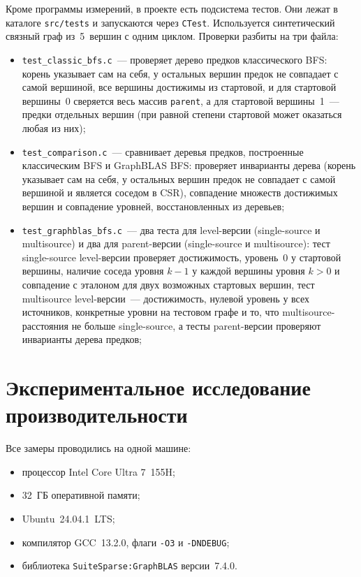 \documentclass[a4paper]{article}
\begin{document}
Кроме программы измерений, в проекте есть подсистема тестов. Они лежат в каталоге \texttt{src/tests} и запускаются через \texttt{CTest}. Используется синтетический связный граф из~5~вершин с одним циклом. Проверки разбиты на три файла:
\begin{itemize}
    \item \texttt{test\_classic\_bfs.c}~--- проверяет дерево предков классического BFS: корень указывает сам на себя, у остальных вершин предок не совпадает с самой вершиной, все вершины достижимы из стартовой, и для стартовой вершины~0 сверяется весь массив \texttt{parent}, а для стартовой вершины~1~--- предки отдельных вершин (при равной степени стартовой может оказаться любая из них);
    \item \texttt{test\_comparison.c}~--- сравнивает деревья предков, построенные классическим BFS и GraphBLAS BFS: проверяет инварианты дерева (корень указывает сам на себя, у остальных вершин предок не совпадает с самой вершиной и является соседом в CSR), совпадение множеств достижимых вершин и совпадение уровней, восстановленных из деревьев;
    \item \texttt{test\_graphblas\_bfs.c}~--- два теста для level-версии (single-source и multisource) и два для parent-версии (single-source и multisource): тест single-source level-версии проверяет достижимость, уровень~0 у стартовой вершины, наличие соседа уровня $k-1$ у каждой вершины уровня $k > 0$ и совпадение с эталоном для двух возможных стартовых вершин, тест multisource level-версии~--- достижимость, нулевой уровень у всех источников, конкретные уровни на тестовом графе и то, что multisource-расстояния не больше single-source, а тесты parent-версии проверяют инварианты дерева предков;
\end{itemize}

\section{Экспериментальное исследование производительности}

Все замеры проводились на одной машине:
\begin{itemize}
    \item процессор Intel Core Ultra 7~155H;
    \item 32~ГБ оперативной памяти;
    \item Ubuntu~24.04.1~LTS;
    \item компилятор GCC~13.2.0, флаги \texttt{-O3} и \texttt{-DNDEBUG};
    \item библиотека \texttt{SuiteSparse:GraphBLAS} версии~7.4.0.
\end{itemize}
\end{document}
